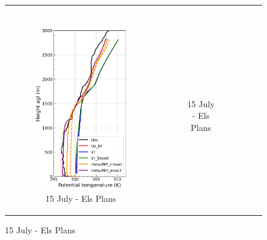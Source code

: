 \begin{figure}[hbtp]
{\begin{tabular}{@{}cccc@{}}
\begin{subfigure}[t]{0.29\textwidth}
        \end{subfigure} \\
        \begin{subfigure}[t]{0.382\textwidth}
            \caption{15 July - Els Plans}
            \includegraphics[width=\textwidth]{images/chap6/profiles/profile_elsplans_theta_1507_sensbins.png}
        \end{subfigure} &
        \begin{subfigure}[t]{0.29\textwidth}
            \caption{15 July - Els Plans}

\end{subfigure}
\end{tabular}}
\end{figure}

